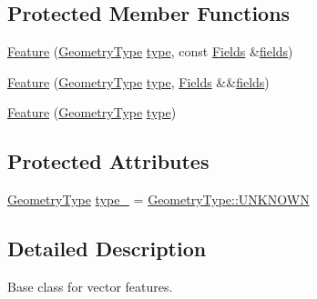 \subsection*{Protected Member Functions}
\begin{DoxyCompactItemize}
\item 
\hyperlink{classdg_1_1deepcore_1_1vector_1_1_feature_a39c425e8cf84ed1915481290e8fae942}{Feature} (\hyperlink{group___vector_module_gade61c1773afa31064c4eae92cb6bb0b8}{Geometry\+Type} \hyperlink{classdg_1_1deepcore_1_1vector_1_1_feature_af8c970b232d0c9758603fed27ce4fbf0}{type}, const \hyperlink{group___vector_module_gabeca0d4b0cbea4335ae890255ca59128}{Fields} \&\hyperlink{classdg_1_1deepcore_1_1vector_1_1_feature_a932740031038833666cd2afd1ada92f4}{fields})
\item 
\hyperlink{classdg_1_1deepcore_1_1vector_1_1_feature_a9cd51645d01c1e727f6bb0b54d352e25}{Feature} (\hyperlink{group___vector_module_gade61c1773afa31064c4eae92cb6bb0b8}{Geometry\+Type} \hyperlink{classdg_1_1deepcore_1_1vector_1_1_feature_af8c970b232d0c9758603fed27ce4fbf0}{type}, \hyperlink{group___vector_module_gabeca0d4b0cbea4335ae890255ca59128}{Fields} \&\&\hyperlink{classdg_1_1deepcore_1_1vector_1_1_feature_a932740031038833666cd2afd1ada92f4}{fields})
\item 
\hyperlink{classdg_1_1deepcore_1_1vector_1_1_feature_a7456940b2ee743ba40f04b5cbc9c8ae8}{Feature} (\hyperlink{group___vector_module_gade61c1773afa31064c4eae92cb6bb0b8}{Geometry\+Type} \hyperlink{classdg_1_1deepcore_1_1vector_1_1_feature_af8c970b232d0c9758603fed27ce4fbf0}{type})
\end{DoxyCompactItemize}
\subsection*{Protected Attributes}
\begin{DoxyCompactItemize}
\item 
\hyperlink{group___vector_module_gade61c1773afa31064c4eae92cb6bb0b8}{Geometry\+Type} \hyperlink{classdg_1_1deepcore_1_1vector_1_1_feature_a2454e027df5975864b2adc3a22d650ba}{type\+\_\+} = \hyperlink{namespacedg_1_1deepcore_1_1vector_gade61c1773afa31064c4eae92cb6bb0b8a696b031073e74bf2cb98e5ef201d4aa3}{Geometry\+Type\+::\+U\+N\+K\+N\+O\+WN}
\end{DoxyCompactItemize}


\subsection{Detailed Description}
Base class for vector features. 

